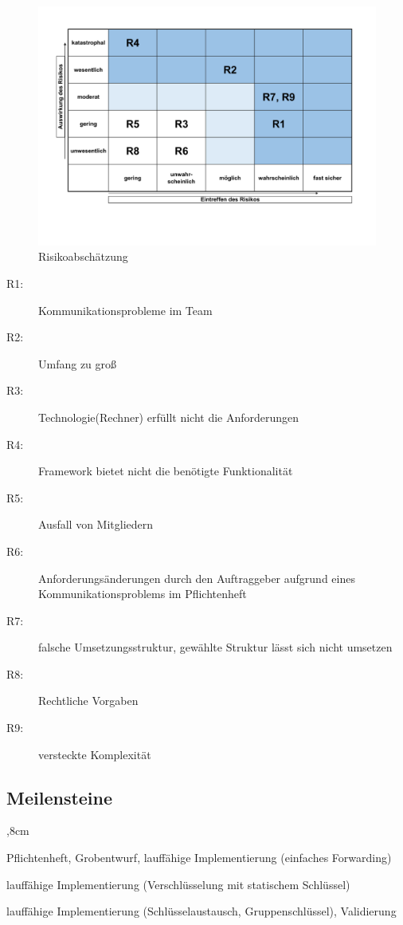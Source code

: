 \documentclass[a4paper, 11pt, ngerman, fleqn]{article}
\begin{document}
\begin{figure}
\begin{center}
	\includegraphics[width= 17cm]{figures/Risikoabschaetzung.pdf}
	\caption{Risikoabschätzung}
	\end{center}
	\end{figure}
	

\begin{description}
		\item[R1:] Kommunikationsprobleme im Team
		\item[R2:] Umfang zu groß
		\item[R3:] Technologie(Rechner) erfüllt nicht die Anforderungen
		\item[R4:] Framework bietet nicht die benötigte Funktionalität
		\item[R5:] Ausfall von Mitgliedern 
		\item[R6:] Anforderungsänderungen durch den Auftraggeber aufgrund eines Kommunikationsproblems im Pflichtenheft
		\item[R7:] falsche Umsetzungsstruktur, gewählte Struktur lässt sich nicht umsetzen
		\item[R8:] Rechtliche Vorgaben
		\item[R9:] versteckte Komplexität
	\end{description}
	
\clearpage
	
\subsection{Meilensteine}
	\begin{description}
	,8cm
		\item[Erster Meilenstein:] Pflichtenheft, Grobentwurf, lauffähige Implementierung (einfaches Forwarding)
		
		\item[Zweiter Meilenstein:] lauffähige Implementierung (Verschlüsselung mit statischem Schlüssel)
		
		\item[Dritter Meilenstein:] lauffähige Implementierung (Schlüsselaustausch, Gruppenschlüssel), Validierung
	\end{description}
	
\end{document}
